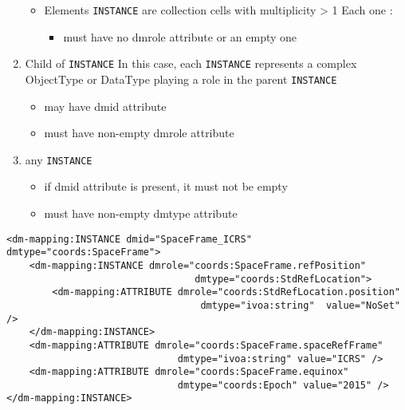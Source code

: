 \begin{enumerate}
\begin{itemize}
     \item Elements \texttt{INSTANCE} are collection cells with multiplicity > 1
          Each one :             
           \begin{itemize}
             \item must have no dmrole attribute or an empty one
           \end{itemize}
  \end{itemize}  
    
\item Child of \texttt{INSTANCE}  
     In this case, each \texttt{INSTANCE} represents 
     a complex ObjectType or DataType playing a role in the parent \texttt{INSTANCE}      
     \begin{itemize}
        \item may have dmid attribute
        \item must have non-empty dmrole attribute
     \end{itemize}
           
\item any \texttt{INSTANCE}      
   \begin{itemize}
        \item if dmid attribute is present, it must not be empty
        \item must have non-empty dmtype attribute
    \end{itemize}
\end{enumerate}  
    
   
\begin{lstlisting}[frame=single,caption={Example of \texttt{INSTANCE} child of GLOBALS},style=XML,basicstyle=\tiny]
<dm-mapping:INSTANCE dmid="SpaceFrame_ICRS" dmtype="coords:SpaceFrame">
	<dm-mapping:INSTANCE dmrole="coords:SpaceFrame.refPosition"
                                 dmtype="coords:StdRefLocation">
		<dm-mapping:ATTRIBUTE dmrole="coords:StdRefLocation.position" 
		                          dmtype="ivoa:string"  value="NoSet" />
	</dm-mapping:INSTANCE>
	<dm-mapping:ATTRIBUTE dmrole="coords:SpaceFrame.spaceRefFrame" 
	                          dmtype="ivoa:string" value="ICRS" />
	<dm-mapping:ATTRIBUTE dmrole="coords:SpaceFrame.equinox" 
	                          dmtype="coords:Epoch"	value="2015" />
</dm-mapping:INSTANCE>
\end{lstlisting}   
   

